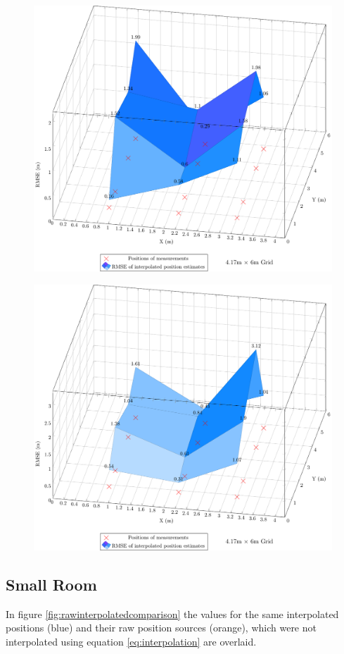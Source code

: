 \documentclass[a4paper, oneside]{ipsreport}
\begin{document}
\begin{figure}[H]
	\centering
	\includegraphics[width=0.8\linewidth]{./figures/rmse/large11window11interpolation.pdf}
	\label{fig:largerroom}

	\vspace{1cm}

	\includegraphics[width=0.8\linewidth]{./figures/rmse/large31window11interpolation.pdf}
	\label{fig:largeroomlargepositionestimate}
\end{figure}

\subsection{Small Room}
In figure \ref{fig:rawinterpolatedcomparison} the values for the same interpolated positions (blue) and their raw position sources (orange), which were not interpolated using equation \ref{eq:interpolation} are overlaid.
\end{document}
